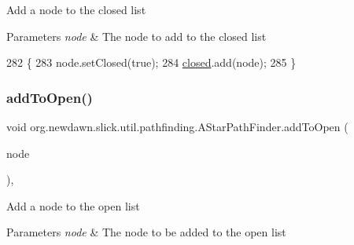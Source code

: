 Add a node to the closed list


\begin{DoxyParams}{Parameters}
{\em node} & The node to add to the closed list \\
\hline
\end{DoxyParams}

\begin{DoxyCode}
282                                           \{
283         node.setClosed(\textcolor{keyword}{true});
284         \mbox{\hyperlink{classorg_1_1newdawn_1_1slick_1_1util_1_1pathfinding_1_1_a_star_path_finder_aa8d4b6dec216f8e3f070889f1c722921}{closed}}.add(node);
285     \}
\end{DoxyCode}
\mbox{\label{classorg_1_1newdawn_1_1slick_1_1util_1_1pathfinding_1_1_a_star_path_finder_a412da764ea584cd8c7f6ae35c5a00314}} 
\subsubsection{\texorpdfstring{add\+To\+Open()}{addToOpen()}}
{\footnotesize\ttfamily void org.\+newdawn.\+slick.\+util.\+pathfinding.\+A\+Star\+Path\+Finder.\+add\+To\+Open (\begin{DoxyParamCaption}\item[{\mbox{\hyperlink{classorg_1_1newdawn_1_1slick_1_1util_1_1pathfinding_1_1_a_star_path_finder_1_1_node}{Node}}}]{node }\end{DoxyParamCaption})\hspace{0.3cm}{\ttfamily [inline]}, {\ttfamily [protected]}}

Add a node to the open list


\begin{DoxyParams}{Parameters}
{\em node} & The node to be added to the open list \\
\hline
\end{DoxyParams}


